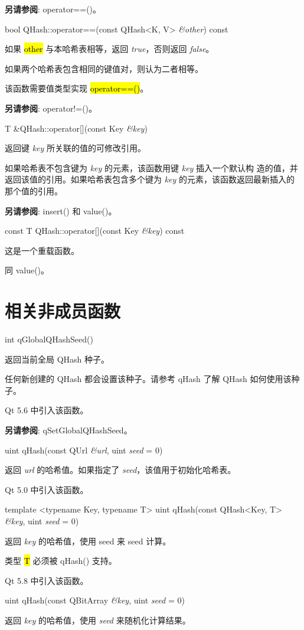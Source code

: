 \textbf{另请参阅}: operator==()。

bool QHash::operator==(const QHash<K, V> \emph{\&other}) const

如果 \hl{other} 与本哈希表相等，返回 \emph{true}，否则返回 \emph{false}。

如果两个哈希表包含相同的键值对，则认为二者相等。

该函数需要值类型实现 \hl{operator==()}。

\textbf{另请参阅}: operator!=()。

T \&QHash::operator[](const Key \emph{\&key})

返回键 \emph{key} 所关联的值的可修改引用。

如果哈希表不包含键为 \emph{key} 的元素，该函数用键 \emph{key} 插入一个默认构
造的值，并返回该值的引用。如果哈希表包含多个键为 \emph{key} 的元素，该函数返回最新插入的那个值的引用。

\textbf{另请参阅}: insert() 和 value()。

const T QHash::operator[](const Key \emph{\&key}) const

这是一个重载函数。

同 value()。

\section{相关非成员函数}

int qGlobalQHashSeed()

返回当前全局 QHash 种子。

任何新创建的 QHash 都会设置该种子。请参考 qHash 了解 QHash 如何使用该种子。

Qt 5.6 中引入该函数。

\textbf{另请参阅}: qSetGlobalQHashSeed。

uint qHash(const QUrl \emph{\&url}, uint \emph{seed} = 0)

返回 \emph{url} 的哈希值。如果指定了 \emph{seed}，该值用于初始化哈希表。

Qt 5.0 中引入该函数。

template <typename Key, typename T> uint qHash(const QHash<Key, T> \emph{\&key}, uint \emph{seed} = 0)

返回 \emph{key} 的哈希值，使用 seed 来 seed 计算。

类型 \hl{T} 必须被 qHash() 支持。

Qt 5.8 中引入该函数。

uint qHash(const QBitArray \emph{\&key}, uint \emph{seed} = 0)

返回 \emph{key} 的哈希值，使用 \emph{seed} 来随机化计算结果。

